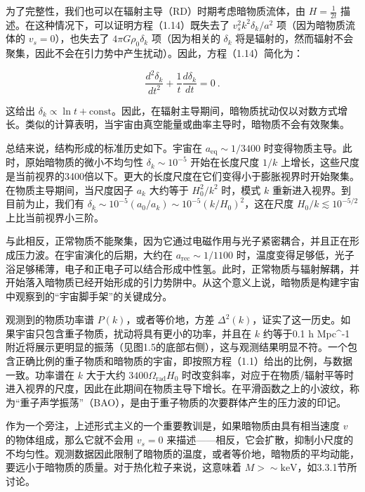 为了完整性，我们也可以在辐射主导（RD）时期考虑暗物质流体，由 \( H = \frac{1}{2t} \) 描述。在这种情况下，可以证明方程（1.14）既失去了 \( v_s^2 k^2 \delta_k/a^2 \) 项（因为暗物质流体的 \( v_s = 0 \)），也失去了 \( 4\pi G \rho_0 \delta_k \) 项（因为相关的 \( \delta_k \) 将是辐射的，然而辐射不会聚集，因此不会在引力势中产生扰动）。因此，方程（1.14）简化为：

\[ \frac{d^2 \delta_k}{dt^2} + \frac{1}{t} \frac{d \delta_k}{dt} = 0 ~. \]

这给出 \( \delta_k \propto \ln t + \text{const} \)。因此，在辐射主导期间，暗物质扰动仅以对数方式增长。类似的计算表明，当宇宙由真空能量或曲率主导时，暗物质不会有效聚集。

总结来说，结构形成的标准历史如下。宇宙在 \( a_{\text{eq}} \sim 1/3400 \) 时变得物质主导。此时，原始暗物质的微小不均匀性 \( \delta_k \sim 10^{-5} \) 开始在长度尺度 \( 1/k \) 上增长，这些尺度是当前视界的3400倍以下。更大的长度尺度在它们变得小于膨胀视界时开始聚集。在物质主导期间，当尺度因子 \( a_k \) 大约等于 \( H_0^2 / k^2 \) 时，模式 \( k \) 重新进入视界。到目前为止，我们有 \( \delta_k \sim 10^{-5}(a_0/a_k) \sim 10^{-5}(k/H_0)^2 \)，这在尺度 \( H_0/k \lesssim 10^{-5/2} \) 上比当前视界小三阶。

与此相反，正常物质不能聚集，因为它通过电磁作用与光子紧密耦合，并且正在形成压力波。在宇宙演化的后期，大约在 \( a_{\text{rec}} \sim 1/1100 \) 时，温度变得足够低，光子浴足够稀薄，电子和正电子可以结合形成中性氢。此时，正常物质与辐射解耦，并开始落入暗物质已经开始形成的引力势阱中。从这个意义上说，暗物质是构建宇宙中观察到的“宇宙脚手架”的关键成分。

观测到的物质功率谱 \( P(k) \)，或者等价地，方差 \( \Delta^2(k) \)，证实了这一历史。如果宇宙只包含重子物质，扰动将具有更小的功率，并且在 \( k \) 约等于0.1 h Mpc^-1 附近将展示更明显的振荡（见图1.5的底部右侧），这与观测结果明显不符。一个包含正确比例的重子物质和暗物质的宇宙，即按照方程（1.1）给出的比例，与数据一致。功率谱在 \( k \) 大于大约 \( 3400 \Omega_{\text{rad}} H_0 \) 时改变斜率，对应于在物质/辐射平等时进入视界的尺度，因此在此期间在物质主导下增长。在平滑函数之上的小波纹，称为“重子声学振荡”（BAO），是由于重子物质的次要群体产生的压力波的印记。

作为一个旁注，上述形式主义的一个重要教训是，如果暗物质由具有相当速度 \( v \) 的物体组成，那么它就不会用 \( v_s = 0 \) 来描述——相反，它会扩散，抑制小尺度的不均匀性。观测数据因此限制了暗物质的温度，或者等价地，暗物质的平均动能，要远小于暗物质的质量。对于热化粒子来说，这意味着 \( M > \sim \text{keV} \)，如3.3.1节所讨论。









 

